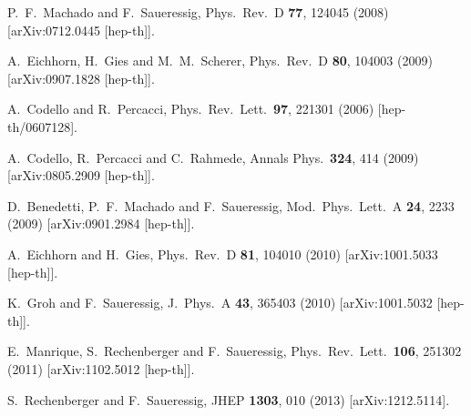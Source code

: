 \documentclass[twocolumn,prd,superscriptaddress,preprintnumbers,amsmath,amssymb,nofootinbib]{revtex4}
\begin{document}
\begin{thebibliography}{99}
  P.~F.~Machado and F.~Saueressig,
  Phys.\ Rev.\ D {\bf 77}, 124045 (2008)
  [arXiv:0712.0445 [hep-th]].

  A.~Eichhorn, H.~Gies and M.~M.~Scherer,
  Phys.\ Rev.\ D {\bf 80}, 104003 (2009)
  [arXiv:0907.1828 [hep-th]].


  A.~Codello and R.~Percacci,
  Phys.\ Rev.\ Lett.\  {\bf 97}, 221301 (2006)
  [hep-th/0607128].

%
  A.~Codello, R.~Percacci and C.~Rahmede,
  Annals Phys.\  {\bf 324}, 414 (2009)
  [arXiv:0805.2909 [hep-th]].

  D.~Benedetti, P.~F.~Machado and F.~Saueressig,
  Mod.\ Phys.\ Lett.\ A {\bf 24}, 2233 (2009)
  [arXiv:0901.2984 [hep-th]].
  
  A.~Eichhorn and H.~Gies,
  Phys.\ Rev.\ D {\bf 81}, 104010 (2010)
  [arXiv:1001.5033 [hep-th]].

  K.~Groh and F.~Saueressig,
  J.\ Phys.\ A {\bf 43}, 365403 (2010)
  [arXiv:1001.5032 [hep-th]].
  

  E.~Manrique, S.~Rechenberger and F.~Saueressig,
  Phys.\ Rev.\ Lett.\  {\bf 106}, 251302 (2011)
  [arXiv:1102.5012 [hep-th]].

  S.~Rechenberger and F.~Saueressig,
  JHEP {\bf 1303}, 010 (2013)
  [arXiv:1212.5114].


\end{thebibliography}
\end{document}
